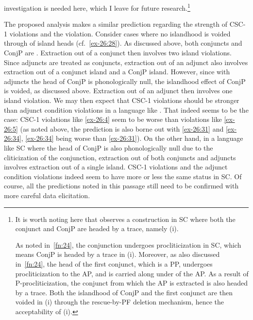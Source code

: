 \documentclass[output=paper]{langsci/langscibook}
\begin{document}
investigation is needed here, which I leave for future research.\footnote{It
    is worth noting here that \textcite{Oda:2017} observes a construction in
    \gls{SC} where both the conjunct and ConjP are headed by a trace, namely
    (i).

\z

As noted in~\cref{fn:24}, the conjunction undergoes procliticization in
\gls{SC}, which means ConjP is headed by a trace in (i). Moreover, as also
discussed in~\cref{fn:24}, the head of the first conjunct, which is a PP,
undergoes procliticization to the AP, and is carried along under  of
the AP. As a result of P-procliticization, the conjunct from which the AP is
extracted is also headed by a trace. Both the islandhood of ConjP and the first
conjunct are then voided in (i) through the rescue-by-\gls{PF} deletion mechanism,
hence the acceptability of (i).}

The proposed analysis makes a similar prediction regarding the strength of
CSC-1 violations and the  violation. Consider cases where no
islandhood is voided through  of island heads (cf.\ \ref{ex-26:28}). As discussed
above, both conjuncts and ConjP are . Extraction out of a conjunct then
involves two island violations. Since adjuncts are treated as conjuncts,
extraction out of an adjunct also involves extraction out of a conjunct island
and a ConjP island. However, since with adjuncts the head of ConjP is
phonologically null, the islandhood effect of ConjP is voided, as discussed
above. Extraction out of an adjunct then involves one island violation. We may
then expect that CSC-1 violations should be stronger than adjunct condition
violations in a language like . That indeed seems to be the case: CSC-1
violations like \eqref{ex-26:4} seem to be worse than  violations like
\eqref{ex-26:5} (as noted above, the prediction is also borne out with  \eqref{ex-26:31} and \eqref{ex-26:34},
\eqref{ex-26:34} being worse than \eqref{ex-26:31}). On the other hand, in a language like \gls{SC}
where the head of ConjP is also phonologically null due to the cliticization of
the conjunction, extraction out of both conjuncts and adjuncts involves
extraction out of a single island. CSC-1 violations and the adjunct condition
violations indeed seem to have more or less the same status in \gls{SC}. Of course,
all the predictions noted in this passage still need to be confirmed with more
careful data elicitation.
\end{document}
